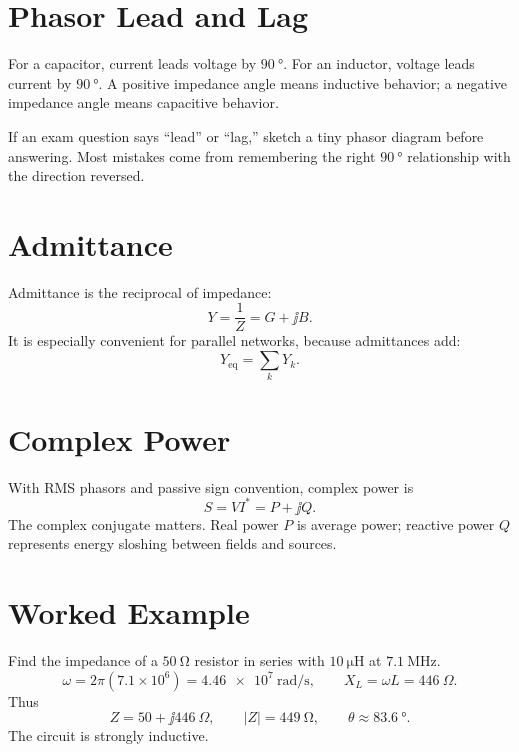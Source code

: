 \section{Phasor Lead and Lag}
For a capacitor, current leads voltage by \(\SI{90}{\degree}\). For an
inductor, voltage leads current by \(\SI{90}{\degree}\). A positive impedance
angle means inductive behavior; a negative impedance angle means capacitive
behavior.

\begin{exambox}
If an exam question says ``lead'' or ``lag,'' sketch a tiny phasor diagram before
answering. Most mistakes come from remembering the right \(\SI{90}{\degree}\)
relationship with the direction reversed.
\end{exambox}

\section{Admittance}
Admittance is the reciprocal of impedance:
\[
Y=\frac{1}{Z}=G+\jj B.
\]
It is especially convenient for parallel networks, because admittances add:
\[
Y_{\mathrm{eq}}=\sum_k Y_k.
\]

\section{Complex Power}
With RMS phasors and passive sign convention, complex power is
\[
S=VI^*=P+\jj Q.
\]
The complex conjugate matters. Real power \(P\) is average power; reactive power
\(Q\) represents energy sloshing between fields and sources.

\section{Worked Example}
Find the impedance of a \(\SI{50}{\ohm}\) resistor in series with
\(\SI{10}{\micro\henry}\) at \(\SI{7.1}{\mega\hertz}\).
\[
\omega=2\pi(7.1\times10^6)=\SI{4.46e7}{\radian\per\second},
\qquad
X_L=\omega L=446~\Omega.
\]
Thus
\[
Z=50+\jj 446~\Omega,
\qquad
|Z|=\SI{449}{\ohm},
\qquad
\theta\approx \SI{83.6}{\degree}.
\]
The circuit is strongly inductive.
